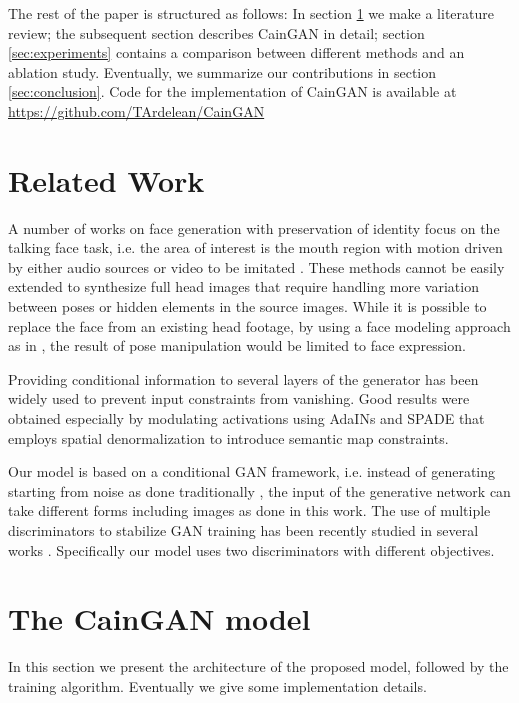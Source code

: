 \documentclass[11pt,a4paper]{article}
\begin{document}
The rest of the paper is structured as follows: In section \ref{sec:related} we make a literature review; the subsequent section describes CainGAN in detail; section \ref{sec:experiments} contains a comparison between different methods and an ablation study. Eventually, we summarize our contributions in section \ref{sec:conclusion}. Code for the implementation of CainGAN is available at \href{https://github.com/TArdelean/CainGAN}{https://github.com/TArdelean/CainGAN}

\section{Related Work}
\label{sec:related}
A number of works on face generation with preservation of identity focus on the talking face task, i.e. the area of interest is the mouth region with motion driven by either audio sources \cite{chen2018lip,XuSoundTV,suwajanakorn2017obama,zhou2019talking} or video to be imitated \cite{ijcai2019-129,zhou2019talking}. These methods cannot be easily extended to synthesize full head images that require handling more variation between poses or hidden elements in the source images. While it is possible to replace the face from an existing head footage, by using a face modeling approach as in \cite{thies2018face2face}, the result of pose manipulation would be limited to face expression.

Providing conditional information to several layers of the generator has been widely used to prevent input constraints from vanishing. Good results were obtained especially by modulating activations using AdaINs \cite{chen2018on,huang2017adain,tero2018style} and SPADE \cite{park2019SPADE} that employs spatial denormalization to introduce semantic map constraints.

Our model is based on a conditional GAN framework, i.e. instead of generating starting from noise as done traditionally \cite{NIPS2014_5423}, the input of the generative network can take different forms including images \cite{pix2pix2017,park2019SPADE} as done in this work. The use of multiple discriminators to stabilize GAN training has been recently studied in several works \cite{carneiro2019,Durugkar2016GenerativeMN,NIPS2017_6860}. Specifically our model uses two discriminators with different objectives.

\section{The CainGAN model}
In this section we present the architecture of the proposed model, followed by the training algorithm. Eventually we give some implementation details.
\end{document}
